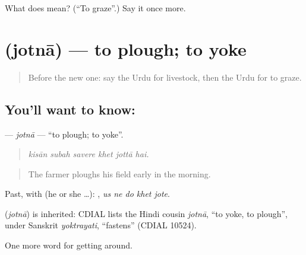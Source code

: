 \begin{tcolorbox}[breakable,colback=teal!4,colframe=teal!35!black,title={Before you move on}]
What does  mean? (\textquotedblleft{}To graze\textquotedblright{}.) Say it once more.
\end{tcolorbox}
\section[\texorpdfstring{\ur{جوتنا} (jotnā)}{جوتنا (jotnā)}]{ (jotnā) — to plough; to yoke}

\label{lesson:UR-C439-jotna}



\begin{quote}
Before the new one: say the Urdu for livestock, then the Urdu for to graze.
\end{quote}

\subsection*{You'll want to know: }
\textbf{} — \emph{jotnā} — \textquotedblleft{}to plough; to yoke\textquotedblright{}.

\begin{quote}
     
\end{quote}

\begin{quote}
\emph{kisān subah savere khet jottā hai.}
\end{quote}

\begin{quote}
The farmer ploughs his field early in the morning.
\end{quote}

Past, with  (he or she …):     , \emph{us ne do khet jote}.

\begin{cousinweb}
\textbf{} (\emph{jotnā}) is inherited: CDIAL lists the Hindi cousin \emph{jotnā}, \textquotedblleft{}to yoke, to plough\textquotedblright{}, under Sanskrit \emph{yoktrayati}, \textquotedblleft{}fastens\textquotedblright{} (CDIAL 10524).
\end{cousinweb}

\begin{grammarlens}[title={What you've built}]
One more word for getting around.
\end{grammarlens}

